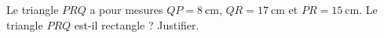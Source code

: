 
\begin{exercice}\label{exosmath-0953}

    Le triangle \( PRQ\) a pour mesures \( QP=\SI{8}{\centi\meter}\), \( QR=\SI{17}{\centi\meter}\) et \( PR=\SI{15}{\centi\meter}\). Le triangle \( PRQ\) est-il rectangle ? Justifier.

\end{exercice}
